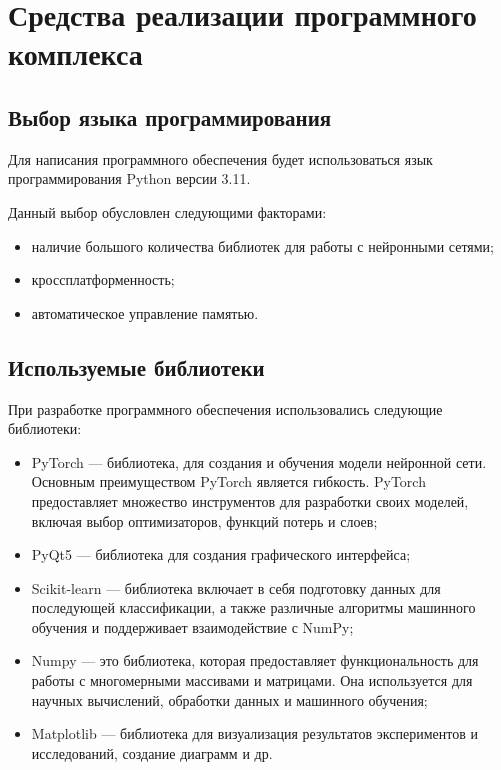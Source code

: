 \section{Средства реализации программного комплекса}

\subsection{Выбор языка программирования}
Для написания программного обеспечения будет использоваться язык программирования Python \cite[]{python} версии 3.11.

Данный выбор обусловлен следующими факторами:
\begin{itemize}
    \item наличие большого количества библиотек для работы с нейронными сетями;
    \item кроссплатформенность;
    \item автоматическое управление памятью.
\end{itemize}

\subsection{Используемые библиотеки}
При разработке программного обеспечения использовались следующие
библиотеки:
\begin{itemize}
    \item PyTorch \cite{torch} --- библиотека, для создания и обучения модели нейронной сети. Основным преимуществом PyTorch является гибкость. PyTorch предоставляет множество инструментов для разработки своих моделей, включая выбор оптимизаторов, функций потерь и слоев;
    \item PyQt5 \cite{pyqt} --- библиотека для создания графического интерфейса;
    \item Scikit-learn \cite{scikit}  --- библиотека включает в себя подготовку данных для последующей классификации, а также различные алгоритмы машинного обучения и поддерживает взаимодействие с NumPy;
    \item Numpy \cite{numpy} --- это библиотека, которая предоставляет функциональность для работы с многомерными массивами и матрицами. Она используется для научных вычислений, обработки данных и машинного обучения;
    \item Matplotlib \cite{matplot} --- библиотека для визуализация результатов экспериментов и исследований, создание диаграмм и др.
\end{itemize}

